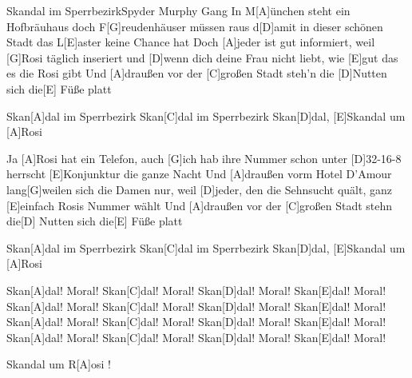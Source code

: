 \documentclass[../main.tex]{subfiles}
\begin{document}
\begin{song}[2]{Skandal im Sperrbezirk}{Spyder Murphy Gang}{}
In M[A]{ü}nchen steht ein Hofbräuhaus doch F[G]reudenhäuser müssen raus
d[D]amit in dieser schönen Stadt das L[E]aster keine Chance hat
Doch [A]jeder ist gut informiert, weil [G]Rosi täglich inseriert
und [D]wenn dich deine Frau nicht liebt, wie [E]gut das es die Rosi gibt
Und [A]draußen vor der [C]großen Stadt steh'n die [D]Nutten sich die[E] Füße platt

Skan[A]dal im Sperrbezirk
Skan[C]dal im Sperrbezirk
Skan[D]dal, [E]Skandal um [A]Rosi

Ja [A]Rosi hat ein Telefon, auch [G]ich hab ihre Nummer schon
unter [D]32-16-8 herrscht [E]Konjunktur die ganze Nacht
Und [A]draußen vorm Hotel D'Amour lang[G]weilen sich die Damen nur,
weil [D]jeder, den die Sehnsucht quält, ganz [E]einfach Rosis Nummer wählt
Und [A]draußen vor der [C]großen Stadt stehn die[D] Nutten sich die[E] Füße platt

Skan[A]dal im Sperrbezirk
Skan[C]dal im Sperrbezirk
Skan[D]dal, [E]Skandal um [A]Rosi

Skan[A]dal! Moral! Skan[C]dal! Moral! Skan[D]dal! Moral! Skan[E]dal! Moral!
Skan[A]dal! Moral! Skan[C]dal! Moral! Skan[D]dal! Moral! Skan[E]dal! Moral!
Skan[A]dal! Moral! Skan[C]dal! Moral! Skan[D]dal! Moral! Skan[E]dal! Moral!
Skan[A]dal! Moral! Skan[C]dal! Moral! Skan[D]dal! Moral! Skan[E]dal! Moral!

Skandal um R[A]osi !
\end{song}
\end{document}

